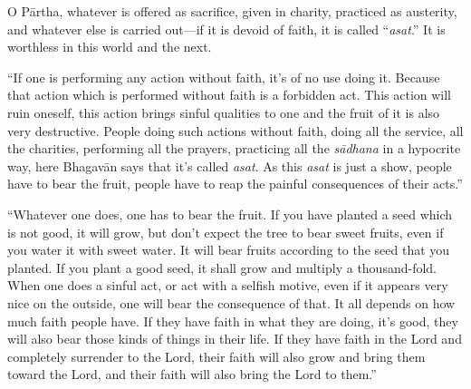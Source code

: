 {O Pārtha, whatever is offered as sacrifice, given in charity, practiced as austerity, and whatever else is carried out---if it is devoid of faith, it is called \enquote{\textit{asat}.} It is worthless in this world and the next.}

\enquote{If one is performing any action without faith, it’s of no use doing it. Because that action which is performed without faith is a forbidden act. This action will ruin oneself, this action brings sinful qualities to one and the fruit of it is also very destructive. People doing such actions without faith, doing all the service, all the charities, performing all the prayers, practicing all the \textit{sādhana} in a hypocrite way, here Bhagavān says that it’s called \textit{asat}. As this \textit{asat} is just a show, people have to bear the fruit, people have to reap the painful consequences of their acts.}

\enquote{Whatever one does, one has to bear the fruit. If you have planted a seed which is not good, it will grow, but don’t expect the tree to bear sweet fruits, even if you water it with sweet water. It will bear fruits according to the seed that you planted. If you plant a good seed, it shall grow and multiply a thousand-fold. When one does a sinful act, or act with a selfish motive, even if it appears very nice on the outside, one will bear the consequence of that. It all depends on how much faith people have. If they have faith in what they are doing, it’s good, they will also bear those kinds of things in their life. If they have faith in the Lord and completely surrender to the Lord, their faith will also grow and bring them toward the Lord, and their faith will also bring the Lord to them.}

